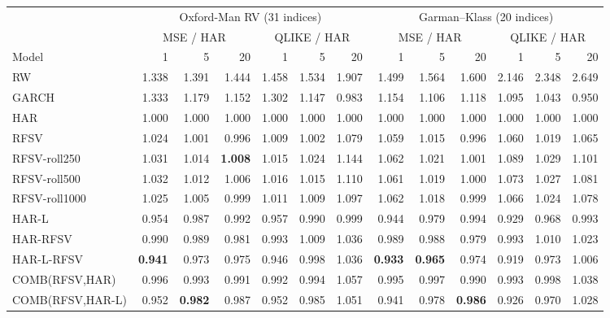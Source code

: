 \begin{tabular}{lrrrrrr@{\hskip 14pt}rrrrrr}
\toprule
 & \multicolumn{6}{c}{Oxford-Man RV (31 indices)} & \multicolumn{6}{c}{Garman--Klass (20 indices)}\\
 & \multicolumn{3}{c}{MSE / HAR} & \multicolumn{3}{c}{QLIKE / HAR} & \multicolumn{3}{c}{MSE / HAR} & \multicolumn{3}{c}{QLIKE / HAR}\\
Model & 1 & 5 & 20 & 1 & 5 & 20 & 1 & 5 & 20 & 1 & 5 & 20\\
\midrule
RW & 1.338 & 1.391 & 1.444 & 1.458 & 1.534 & 1.907 & 1.499 & 1.564 & 1.600 & 2.146 & 2.348 & 2.649\\
GARCH & 1.333 & 1.179 & 1.152 & 1.302 & 1.147 & 0.983 & 1.154 & 1.106 & 1.118 & 1.095 & 1.043 & 0.950\\
HAR & 1.000 & 1.000 & 1.000 & 1.000 & 1.000 & 1.000 & 1.000 & 1.000 & 1.000 & 1.000 & 1.000 & 1.000\\
RFSV & 1.024 & 1.001 & 0.996 & 1.009 & 1.002 & 1.079 & 1.059 & 1.015 & 0.996 & 1.060 & 1.019 & 1.065\\
\midrule
RFSV-roll250 & 1.031 & 1.014 & \textbf{1.008} & 1.015 & 1.024 & 1.144 & 1.062 & 1.021 & 1.001 & 1.089 & 1.029 & 1.101\\
RFSV-roll500 & 1.032 & 1.012 & 1.006 & 1.016 & 1.015 & 1.110 & 1.061 & 1.019 & 1.000 & 1.073 & 1.027 & 1.081\\
RFSV-roll1000 & 1.025 & 1.005 & 0.999 & 1.011 & 1.009 & 1.097 & 1.062 & 1.018 & 0.999 & 1.066 & 1.024 & 1.078\\
\midrule
HAR-L & 0.954 & 0.987 & 0.992 & 0.957 & 0.990 & 0.999 & 0.944 & 0.979 & 0.994 & 0.929 & 0.968 & 0.993\\
HAR-RFSV & 0.990 & 0.989 & 0.981 & 0.993 & 1.009 & 1.036 & 0.989 & 0.988 & 0.979 & 0.993 & 1.010 & 1.023\\
HAR-L-RFSV & \textbf{0.941} & 0.973 & 0.975 & 0.946 & 0.998 & 1.036 & \textbf{0.933} & \textbf{0.965} & 0.974 & 0.919 & 0.973 & 1.006\\
\midrule
COMB(RFSV,HAR) & 0.996 & 0.993 & 0.991 & 0.992 & 0.994 & 1.057 & 0.995 & 0.997 & 0.990 & 0.993 & 0.998 & 1.038\\
COMB(RFSV,HAR-L) & 0.952 & \textbf{0.982} & 0.987 & 0.952 & 0.985 & 1.051 & 0.941 & 0.978 & \textbf{0.986} & 0.926 & 0.970 & 1.028\\
\bottomrule
\end{tabular}
